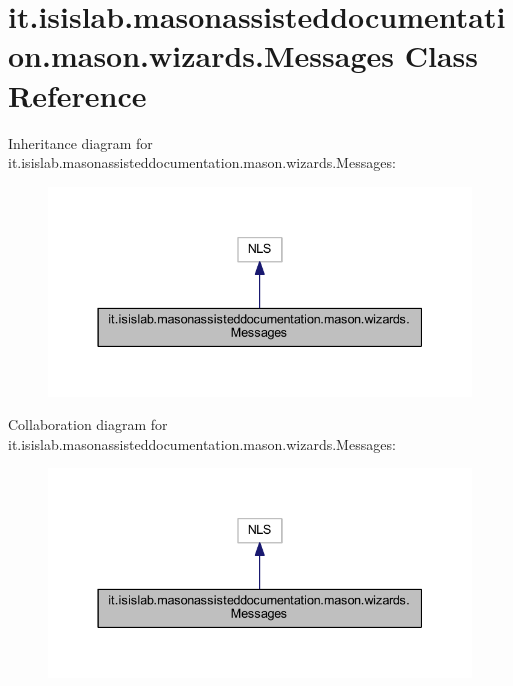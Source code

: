 \hypertarget{classit_1_1isislab_1_1masonassisteddocumentation_1_1mason_1_1wizards_1_1_messages}{\section{it.\-isislab.\-masonassisteddocumentation.\-mason.\-wizards.\-Messages Class Reference}
\label{classit_1_1isislab_1_1masonassisteddocumentation_1_1mason_1_1wizards_1_1_messages}
}


Inheritance diagram for it.\-isislab.\-masonassisteddocumentation.\-mason.\-wizards.\-Messages\-:\nopagebreak
\begin{figure}[H]
\begin{center}
\leavevmode
\includegraphics[width=337pt]{classit_1_1isislab_1_1masonassisteddocumentation_1_1mason_1_1wizards_1_1_messages__inherit__graph}
\end{center}
\end{figure}


Collaboration diagram for it.\-isislab.\-masonassisteddocumentation.\-mason.\-wizards.\-Messages\-:\nopagebreak
\begin{figure}[H]
\begin{center}
\leavevmode
\includegraphics[width=337pt]{classit_1_1isislab_1_1masonassisteddocumentation_1_1mason_1_1wizards_1_1_messages__coll__graph}
\end{center}
\end{figure}
